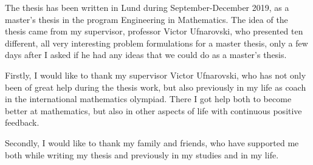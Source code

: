 The thesis has been written in Lund during September-December 2019, as a master's thesis in the program Engineering in Mathematics. The idea of the thesis came from my supervisor, professor Victor Ufnarovski, who presented ten different, all very interesting problem formulations for a master thesis, only a few days after I asked if he had any ideas that we could do as a master's thesis.

Firstly, I would like to thank my supervisor Victor Ufnarovski, who has not only been of great help during the thesis work, but also previously in my life as coach in the international mathematics olympiad. There I got help both to become better at mathematics, but also in other aspects of life with continuous positive feedback.

Secondly, I would like to thank my family and friends, who have supported me both while writing my thesis and previously in my studies and in my life.
